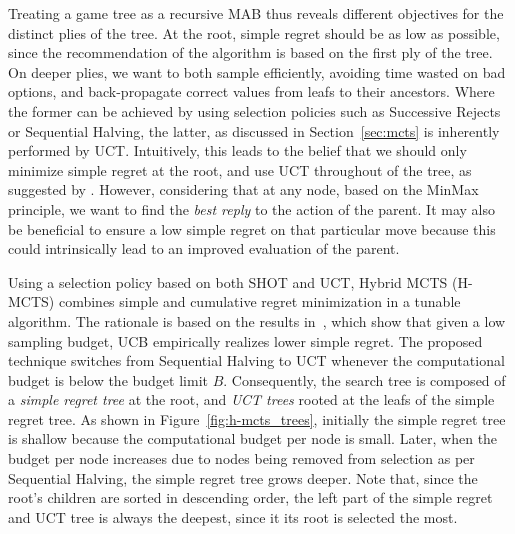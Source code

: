 \documentclass[a4paper]{llncs}
\begin{document}
Treating a game tree as a recursive MAB thus reveals different objectives for the distinct plies of the tree. At the root, simple regret should be as low as possible, since the recommendation of the algorithm is based on the first ply of the tree. On deeper plies, we want to both sample efficiently, avoiding time wasted on bad options, and back-propagate correct values from leafs to their ancestors. Where the former can be achieved by using selection policies such as Successive Rejects or Sequential Halving, the latter, as discussed in Section~\ref{sec:mcts} is inherently performed by UCT. Intuitively, this leads to the belief that we should only minimize simple regret at the root, and use UCT throughout of the tree, as suggested by \cite{tolpin2012mcts}.
However, considering that at any node, based on the MinMax principle, we want to find the \emph{best reply} to the action of the parent. It may also be beneficial to ensure a low simple regret on that particular move because this could intrinsically lead to an improved evaluation of the parent.

Using a selection policy based on both SHOT and UCT, Hybrid MCTS (H-MCTS) combines simple and cumulative regret minimization in a tunable algorithm. The rationale is based on the results in~\cite{Bubeck11Pure}, which show that given a low sampling budget, UCB empirically realizes lower simple regret. 
The proposed technique switches from Sequential Halving to UCT whenever the computational budget is below the budget limit $B$.
Consequently, the search tree is composed of a \emph{simple regret tree} at the root, and \emph{UCT trees} rooted at the leafs of the simple regret tree. As shown in Figure~\ref{fig:h-mcts_trees}, initially the simple regret tree is shallow because the computational budget per node is small. Later, when the budget per node increases due to nodes being removed from selection as per Sequential Halving, the simple regret tree grows deeper. Note that, since the root's children are sorted in descending order, the left part of the simple regret and UCT tree is always the deepest, since it its root is selected the most.
\end{document}
